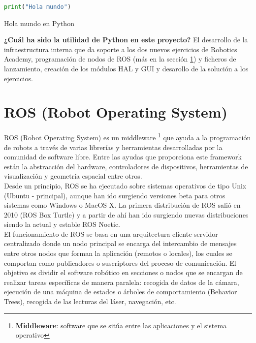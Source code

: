 \begin{code}[H]
\begin{lstlisting}[language=Python]
print("Hola mundo")
\end{lstlisting}
\caption[Hola mundo en Python]{Hola mundo en Python}
\label{cod:holamundo_python}
\end{code}

\textbf{¿Cuál ha sido la utilidad de Python en este proyecto?} El desarrollo de la infraestructura interna que da soporte a los dos nuevos ejercicios de Robotics Academy, programación de nodos de ROS (más en la sección \ref{sec:ros}) y ficheros de lanzamiento, creación de los módulos HAL y GUI y desarollo de la solución a los ejercicios.




\section{ROS (Robot Operating System)}
\label{sec:ros}
ROS (Robot Operating System) es un middleware \footnote{\textbf{Middleware}: software que se sitúa entre las aplicaciones y el sistema operativo} que ayuda a la programación de robots a través de varias librerías y herramientas desarrolladas por la comunidad de software libre. Entre las ayudas que proporciona este framework están la abstracción del hardware, controladores de dispositivos, herramientas de visualización y geometría espacial entre otros.\\

Desde un principio, ROS se ha ejecutado sobre sistemas operativos de tipo Unix (Ubuntu - principal), aunque han ido surgiendo versiones beta para otros sistemas como Windows o MacOS X. La primera distribución de ROS salió en 2010 (ROS Box Turtle) y a partir de ahí han ido surgiendo nuevas distribuciones siendo la actual y estable ROS Noetic.\\

El funcionamiento de ROS se basa en una arquitectura cliente-servidor centralizado donde un nodo principal se encarga del intercambio de mensajes entre otros nodos que forman la aplicación (remotos o locales), los cuales se comportan como publicadores o suscriptores del proceso de comunicación. El objetivo es dividir el software robótico en secciones o nodos que se encargan de realizar tareas específicas de manera paralela: recogida de datos de la cámara, ejecución de una máquina de estados o árboles de comportamiento (Behavior Trees), recogida de las lecturas del láser, navegación, etc.\\

